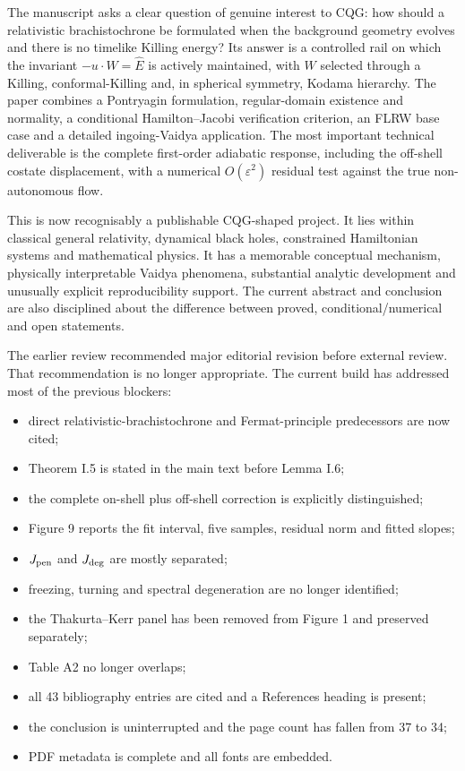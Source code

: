 \documentclass[11pt,a4paper]{article}
\newcommand{\Ehat}{\hat E}
\begin{document}
The manuscript asks a clear question of genuine interest to CQG: how should a relativistic
brachistochrone be formulated when the background geometry evolves and there is no timelike
Killing energy? Its answer is a controlled rail on which the invariant
$-u\!\cdot\!W=\Ehat$ is actively maintained, with $W$ selected through a Killing,
conformal-Killing and, in spherical symmetry, Kodama hierarchy. The paper combines a
Pontryagin formulation, regular-domain existence and normality, a conditional
Hamilton--Jacobi verification criterion, an FLRW base case and a detailed ingoing-Vaidya
application. The most important technical deliverable is the complete first-order
adiabatic response, including the off-shell costate displacement, with a numerical
$O(\varepsilon^2)$ residual test against the true non-autonomous flow.

This is now recognisably a publishable CQG-shaped project. It lies within classical general
relativity, dynamical black holes, constrained Hamiltonian systems and mathematical physics.
It has a memorable conceptual mechanism, physically interpretable Vaidya phenomena,
substantial analytic development and unusually explicit reproducibility support. The
current abstract and conclusion are also disciplined about the difference between proved,
conditional/numerical and open statements.

The earlier review recommended major editorial revision before external review. That
recommendation is no longer appropriate. The current build has addressed most of the
previous blockers:

\begin{itemize}
  \item direct relativistic-brachistochrone and Fermat-principle predecessors are now cited;
  \item Theorem I.5 is stated in the main text before Lemma I.6;
  \item the complete on-shell plus off-shell correction is explicitly distinguished;
  \item Figure 9 reports the fit interval, five samples, residual norm and fitted slopes;
  \item $J_{\rm pen}$ and $J_{\rm deg}$ are mostly separated;
  \item freezing, turning and spectral degeneration are no longer identified;
  \item the Thakurta--Kerr panel has been removed from Figure 1 and preserved separately;
  \item Table A2 no longer overlaps;
  \item all 43 bibliography entries are cited and a References heading is present;
  \item the conclusion is uninterrupted and the page count has fallen from 37 to 34;
  \item PDF metadata is complete and all fonts are embedded.
\end{itemize}
\end{document}

